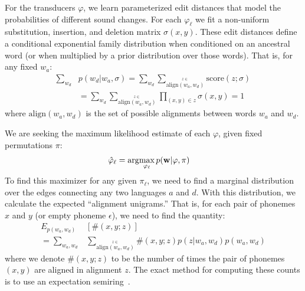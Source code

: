 \documentclass[11pt,a4paper]{article}
\begin{document}
For the transducers $\varphi$, we learn parameterized edit distances
that model the probabilities of different sound changes. For each
$\varphi_\ell$ we fit a non-uniform substitution, insertion, and
deletion matrix $\sigma(x,y)$. These edit distances define a
conditional exponential family distribution when conditioned on an
ancestral word (or when multiplied by a prior distribution over
those words). That is, for any fixed $w_a$: \begin{equation*}
  \begin{split}
    \sum_{w_d} &p(w_d|w_a,\sigma) = \sum_{w_d}
    \sum_{\stackrel{z\in}{\scriptscriptstyle\mathrm{align}(w_a,w_d)}}
    \mathrm{score}(z;\sigma) \\ &= \sum_{w_d}
    \sum_{\stackrel{z\in}{\scriptscriptstyle\mathrm{align}(w_a,w_d)}}
    \prod_{(x,y)\in z} \sigma(x,y) = 1
   \end{split}
 \end{equation*}
where $\mathrm{align}(w_a,w_d)$ is the set of possible alignments between words $w_a$ and $w_d$.

We are seeking the maximum likelihood estimate of each $\varphi$, given
fixed permutations $\pi$:
\begin{equation*}
  \begin{split}
    \hat\varphi_{\ell} &= \arg\negthinspace\max_{\varphi_{\ell}} p(\mathbf w|\mathbf \varphi,\mathbf\pi)
   \end{split}
 \end{equation*}
To find this maximizer for any given $\pi_\ell$, we need to find a marginal
distribution over the edges connecting any two languages $a$ and
$d$. With this distribution, we calculate the expected ``alignment
unigrams.'' That is,  for each pair of phonemes $x$ and $y$ (or
empty phoneme $\epsilon$), we need to find the quantity:
\begin{equation*}
  \begin{split}
    E_{p(w_a,w_d)}&[\#(x,y;z)] \\ = \sum_{w_a,w_d} &\sum_{\stackrel{z\in}{\scriptscriptstyle\mathrm{align}(w_a,w_d)}} \#(x,y;z) p(z|w_a,w_d)p(w_a,w_d)
   \end{split}
 \end{equation*}
where we denote $\#(x,y;z)$ to be the number of times the pair of
phonemes $(x,y)$ are aligned in alignment $z$.  The exact method
for computing these counts is to use an expectation
semiring~\cite{eisner2001expectation}.
\end{document}
